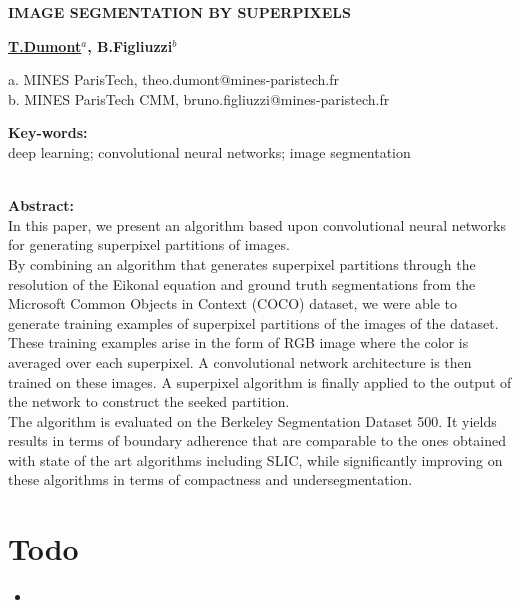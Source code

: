 \documentclass{article}
\begin{document}
\begin{center}
    \begin{Large}\textbf{IMAGE SEGMENTATION BY SUPERPIXELS}\end{Large}

    \vspace{1cm}
    \begin{large}\textbf{\underline{T.Dumont$^a$}, B.Figliuzzi$^b$}\end{large}

    \vspace{0.5cm}
    a. MINES ParisTech, theo.dumont@mines-paristech.fr\\
    b. MINES ParisTech CMM, bruno.figliuzzi@mines-paristech.fr
    \vspace{1cm}
\end{center}

\begin{center}
\noindent\textbf{Key-words: }\\
deep learning; convolutional neural networks; image segmentation\\
\ \\
\end{center}
\textbf{Abstract: }\\
In this paper, we present an algorithm based upon convolutional neural networks for generating superpixel partitions of images.\\
By combining an algorithm that generates superpixel partitions through the resolution of the Eikonal equation and ground truth segmentations from the Microsoft Common Objects in Context (COCO) dataset, we were able to generate training examples of superpixel partitions of the images of the dataset. These training examples arise in the form of RGB image where the color is averaged over each superpixel. A convolutional network architecture is then trained on these images. A superpixel algorithm is finally applied to the output of the network to construct the seeked partition.\\
The algorithm is evaluated on the Berkeley Segmentation Dataset 500. It yields results in terms of boundary adherence that are comparable to the ones obtained with state of the art algorithms including SLIC, while significantly improving on these algorithms in terms of compactness and undersegmentation.

\tableofcontents

\section*{Todo}
\begin{itemize}
    \item
\end{itemize}
\end{document}
